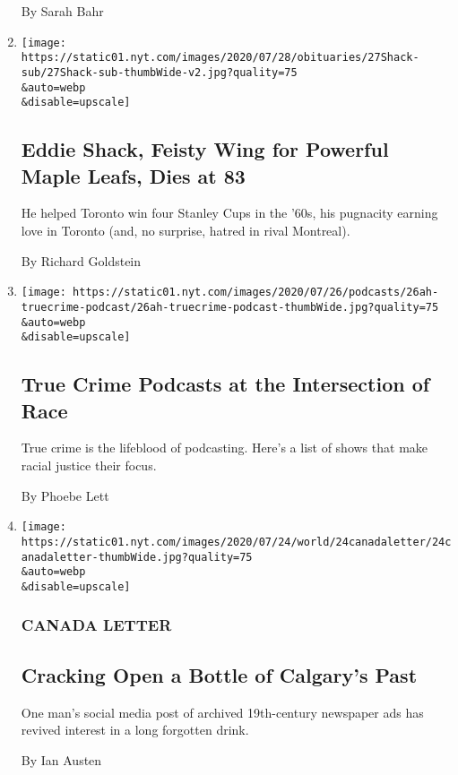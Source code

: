 \begin{enumerate}
  By Sarah Bahr
\item
  \href{/2020/07/27/sports/hockey/eddie-shack-feisty-wing-for-powerful-maple-leafs-dies-at-83.html}{}

  \texttt{[image: https://static01.nyt.com/images/2020/07/28/obituaries/27Shack-sub/27Shack-sub-thumbWide-v2.jpg?quality=75\\\&auto=webp\\\&disable=upscale]}

  \hypertarget{eddie-shack-feisty-wing-for-powerful-maple-leafs-dies-at-83}{%
  \subsection{Eddie Shack, Feisty Wing for Powerful Maple Leafs, Dies at
  83}\label{eddie-shack-feisty-wing-for-powerful-maple-leafs-dies-at-83}}

  He helped Toronto win four Stanley Cups in the '60s, his pugnacity
  earning love in Toronto (and, no surprise, hatred in rival Montreal).

  By Richard Goldstein
\item
  \href{/2020/07/25/at-home/coronavirus-true-crime-podcasts-race.html}{}

  \texttt{[image: https://static01.nyt.com/images/2020/07/26/podcasts/26ah-truecrime-podcast/26ah-truecrime-podcast-thumbWide.jpg?quality=75\\\&auto=webp\\\&disable=upscale]}

  \hypertarget{true-crime-podcasts-at-the-intersection-of-race}{%
  \subsection{True Crime Podcasts at the Intersection of
  Race}\label{true-crime-podcasts-at-the-intersection-of-race}}

  True crime is the lifeblood of podcasting. Here's a list of shows that
  make racial justice their focus.

  By Phoebe Lett
\item
  \href{/2020/07/24/world/canada/cronk.html}{}

  \texttt{[image: https://static01.nyt.com/images/2020/07/24/world/24canadaletter/24canadaletter-thumbWide.jpg?quality=75\\\&auto=webp\\\&disable=upscale]}

  \hypertarget{canada-letter-1}{%
  \subsubsection{CANADA LETTER}\label{canada-letter-1}}

  \hypertarget{cracking-open-a-bottle-of-calgarys-past}{%
  \subsection{Cracking Open a Bottle of Calgary's
  Past}\label{cracking-open-a-bottle-of-calgarys-past}}

  One man's social media post of archived 19th-century newspaper ads has
  revived interest in a long forgotten drink.

  By Ian Austen
\end{enumerate}

